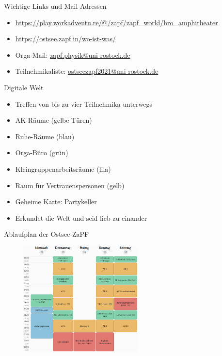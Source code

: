 \documentclass[compress, aspectratio=169]{beamer}
\begin{document}
\begin{frame}{Wichtige Links und Mail-Adressen}
\begin{itemize}
        \item \url{https://play.workadventu.re/@/zapf/zapf\_world/hro\_amphitheater}  \\
        \begin{center}
        \end{center}
        \item \url{https://ostsee.zapf.in/wo-ist-was/}   \\
        \begin{center}
        \end{center}
        \item Orga-Mail: \url{zapf.physik@uni-rostock.de}
        \item Teilnehmikaliste: \url{ostseezapf2021@uni-rostock.de}
\end{itemize}
\end{frame}

\begin{frame}{Digitale Welt}
\begin{itemize}
    \item Treffen von bis zu vier Teilnehmika unterwegs
    \item AK-Räume (gelbe Türen)
    \item Ruhe-Räume (blau)
    \item Orga-Büro (grün)
    \item Kleingruppenarbeitsräume (lila)
    \item Raum für Vertrauenspersonen (gelb)
    \item Geheime Karte: Partykeller
    \item Erkundet die Welt und seid lieb zu einander
\end{itemize}

\end{frame}
	\begin{frame}{Ablaufplan der Ostsee-ZaPF}
		\begin{figure}
			\centering
			\includegraphics[height=5.8cm]{Woche1.png}
		\end{figure}
	\end{frame}
	
\end{document}
